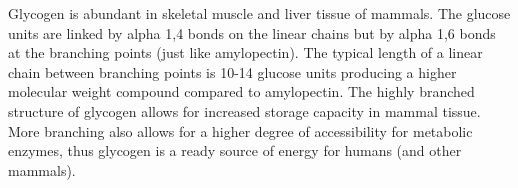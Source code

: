 \documentclass{tufte-handout}
\begin{document}
 Glycogen is abundant in skeletal muscle and liver tissue of mammals. The glucose units are linked by alpha 1,4 bonds on the linear chains but by alpha 1,6 bonds at the branching points (just like amylopectin). The typical length of a linear chain between branching points is 10-14 glucose units producing a higher molecular weight compound compared to amylopectin. The highly branched structure of glycogen allows for increased storage capacity in mammal tissue. More branching also allows for a higher degree of accessibility for metabolic enzymes, thus glycogen is a ready source of energy for humans (and other mammals).  
\end{document}
